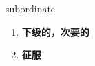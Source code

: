 
\begin{frame}
{\huge subordinate}
\begin{center}
\begin{enumerate}\Large
  \item \textbf{下级的，次要的}
  \item \textbf{征服}
\end{enumerate}
\end{center}
\end{frame}
